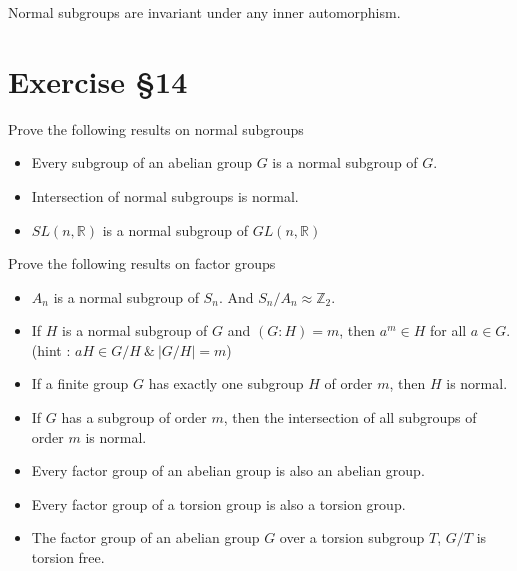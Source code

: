 \begin{remark}
	Normal subgroups are invariant under any inner automorphism.
\end{remark}

\section{Exercise \S14}

\begin{remark}Prove the following results on normal subgroups
	\begin{itemize}
		\item Every subgroup of an abelian group $G$ is a normal subgroup of $G$. %
		\item Intersection of normal subgroups is normal. %
		\item $SL(n,\mathbb{R})$ is a normal subgroup of $GL(n,\mathbb{R})$%
	\end{itemize}
\end{remark}

\begin{remark}Prove the following results on factor groups
	\begin{itemize}
		\item $A_n$ is a normal subgroup of $S_n$.
			And $S_n/A_n \approx \mathbb{Z}_2$.%
		\item If $H$ is a normal subgroup of $G$ and $(G:H) = m$, then $a^m \in H$ for all $a \in G$.%
			(hint : $aH \in G/H\ \&\ |G/H| = m$)
		\item If a finite group $G$ has exactly one subgroup $H$ of order $m$, then $H$ is normal. %
		\item If $G$ has a subgroup of order $m$, then the intersection of all subgroups of order $m$ is normal.%
		\item Every factor group of an abelian group is also an abelian group.%
		\item Every factor group of a torsion group is also a torsion group.%
		\item The factor group of an abelian group $G$ over a torsion subgroup $T$, $G/T$ is torsion free.%
	\end{itemize}
\end{remark}

